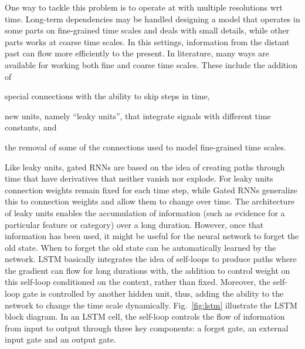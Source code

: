 One way to tackle this problem is to operate at with multiple
resolutions wrt time. Long-term dependencies may be handled designing
a model that operates in some parts on fine-grained time scales and
deals with small details, while other parts works at coarse time
scales. In this settings, information from the distant past can flow
more efficiently to the present. In literature, many ways are
available for working both fine and coarse time scales. These include
the addition of 
\begin{enumerate*}[label=(\roman*)]
  \item special connections with the ability to skip steps in time, 
  \item new units, namely ``leaky units'', that integrate signals with
  different time constants, and 
  \item the removal of some of the connections used to model
  fine-grained time scales.
\end{enumerate*}

Like leaky units, gated RNNs are based on the idea of creating paths
through time that have derivatives that neither vanish nor explode.
For leaky units connection weights remain fixed for each time step,
while Gated RNNs generalize this to connection weights and allow them
to change over time. The architecture of leaky units enables the
accumulation of information (such as evidence for a particular feature
or category) over a long duration. However, once that information has
been used, it might be useful for the neural network to forget the old
state. When to forget the old state can be automatically learned by
the network. LSTM basically integrates the idea of self-loops to
produce paths where the gradient can flow for long durations with, the
addition to control weight on this self-loop conditioned on the
context, rather than fixed. Moreover, the self-loop gate is controlled
by another hidden unit, thus, adding the ability to the network to
change the time scale dynamically. Fig.~\ref{fig:lstm} illustrate the
LSTM block diagram. In an LSTM cell, the self-loop controls the flow
of information from input to output through three key components: a
forget gate, an external input gate and an output gate.

